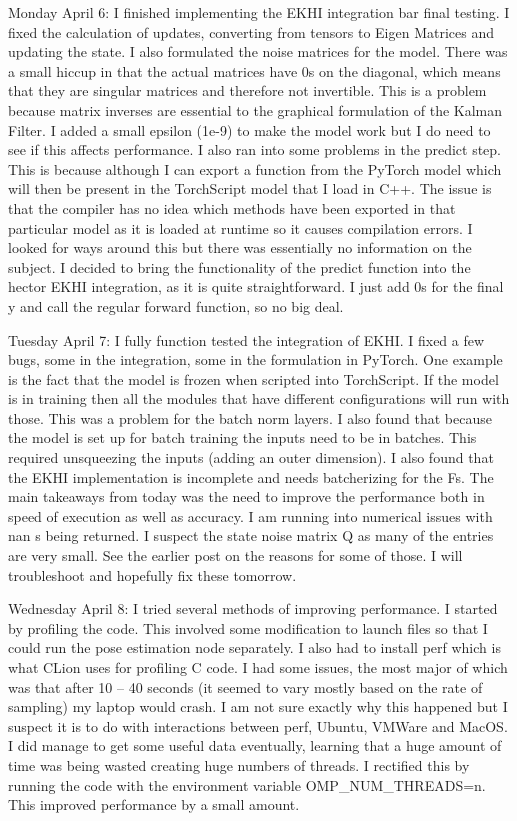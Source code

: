\documentclass[]{../resources/final_report}
\begin{document}
\begin{appendices}
  Monday April 6: I finished implementing the EKHI integration bar final testing. I fixed the calculation of updates, converting from tensors to Eigen Matrices and updating the state. I also formulated the noise matrices for the model. There was a small hiccup in that the actual matrices have 0s on the diagonal, which means that they are singular matrices and therefore not invertible. This is a problem because matrix inverses are essential to the graphical formulation of the Kalman Filter. I added a small epsilon (1e-9) to make the model work but I do need to see if this affects performance. I also ran into some problems in the predict step. This is because although I can export a function from the PyTorch model which will then be present in the TorchScript model that I load in C++. The issue is that the compiler has no idea which methods have been exported in that particular model as it is loaded at runtime so it causes compilation errors. I looked for ways around this but there was essentially no information on the subject. I decided to bring the functionality of the predict function into the hector EKHI integration, as it is quite straightforward. I just add 0s for the final y and call the regular forward function, so no big deal.

  Tuesday April 7: I fully function tested the integration of EKHI. I fixed a few bugs, some in the integration, some in the formulation in PyTorch. One example is the fact that the model is frozen when scripted into TorchScript. If the model is in training then all the modules that have different configurations will run with those. This was a problem for the batch norm layers. I also found that because the model is set up for batch training the inputs need to be in batches. This required unsqueezing the inputs (adding an outer dimension). I also found that the EKHI implementation is incomplete and needs batcherizing for the Fs. The main takeaways from today was the need to improve the performance both in speed of execution as well as accuracy. I am running into numerical issues with nan s being returned. I suspect the state noise matrix Q as many of the entries are very small. See the earlier post on the reasons for some of those. I will troubleshoot and hopefully fix these tomorrow.

  Wednesday April 8: I tried several methods of improving performance. I started by profiling the code. This involved some modification to launch files so that I could run the pose estimation node separately. I also had to install perf which is what CLion uses for profiling C code. I had some issues, the most major of which was that after 10 – 40 seconds (it seemed to vary mostly based on the rate of sampling) my laptop would crash. I am not sure exactly why this happened but I suspect it is to do with interactions between perf, Ubuntu, VMWare and MacOS. I did manage to get some useful data eventually, learning that a huge amount of time was being wasted creating huge numbers of threads. I rectified this by running the code with the environment variable OMP\_NUM\_THREADS=n. This improved performance by a small amount.


\end{appendices}
\end{document}
